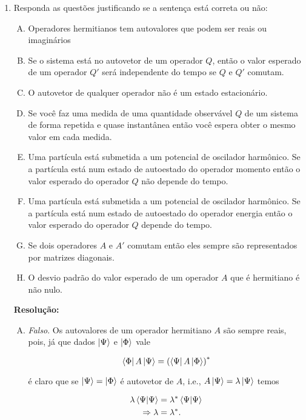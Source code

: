 \documentclass[a4paper, 12pt, notitlepage]{article}
\begin{document}
\begin{enumerate}
\item Responda as questões justificando se a sentença está correta ou não:
\begin{enumerate}[(A)]
  \item Operadores hermitianos tem autovalores que podem ser reais ou imaginários
  \item Se o sistema está no autovetor de um operador $Q$, então o valor esperado de um operador $Q'$ será independente do tempo se $Q$ e $Q'$ comutam.
  \item O autovetor de qualquer operador não é um estado estacionário.
  \item Se você faz uma medida de uma quantidade observável $Q$ de um sistema de forma repetida e quase instantânea então você espera obter o mesmo valor em cada medida.
  \item Uma partícula está submetida a um potencial de oscilador harmônico. Se a partícula está num estado de autoestado do operador momento então o valor esperado do operador $Q$ não depende do tempo.
  \item Uma partícula está submetida a um potencial de oscilador harmônico. Se a partícula está num estado de autoestado do operador energia então o valor esperado do operador $Q$ depende do tempo.
  \item Se dois operadores $A$ e $A'$ comutam então eles sempre são representados por matrizes diagonais.
  \item O desvio padrão do valor esperado de um operador $A$ que é hermitiano é não nulo.
\end{enumerate}

\textbf{Resolução:}
\begin{enumerate}[(A)]
  \item \textit{Falso}. Os autovalores de um operador hermitiano $A$ são sempre reais, pois, já que dados $\ket{\Psi}$ e $\ket{\Phi}$ vale
  
  \[
  \bra{\Phi}A\ket{\Psi} = \left(\bra{\Psi}A\ket{\Phi}\right)^\ast
  \]
  
  \noindent é claro que se $\ket{\Psi} = \ket{\Phi}$ é autovetor de $A$, i.e., $A\ket{\Psi} = \lambda \ket{\Psi}$ temos
  
  \begin{align*}
  \lambda \bra{\Psi}\ket{\Psi} &= \lambda^{\ast} \bra{\Psi}\ket{\Psi} \\
  \Rightarrow \lambda &= \lambda^\ast.
  \end{align*}
  

\end{enumerate}
\end{enumerate}
\end{document}
